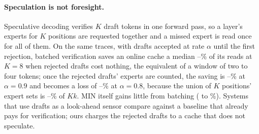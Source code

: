 

\paragraph{Speculation is not foresight.} Speculative decoding verifies $K$ draft tokens in one forward pass, so a
layer's experts for $K$ positions are requested together and a missed expert is read once for all of them. On the same
traces, with drafts accepted at rate $\alpha$ until the first rejection, batched verification saves an online cache a
median \bkFreeMin--\bkFreeMax\% of its reads at $K{=}8$ when rejected drafts cost nothing, the equivalent of a window of
two to four tokens; once the rejected drafts' experts are counted, the saving is \bkSameNineMin--\bkSameNineMax\% at
$\alpha{=}0.9$ and becomes a loss of \bkSameEightLossMin--\bkSameEightLossMax\% at $\alpha{=}0.8$, because the union of
$K$ positions' expert sets is \bkUnionMin--\bkUnionMax\% of $Kk$. MIN itself gains little from batching
(\bkBeladyMin{} to \bkBeladyMax\%). Systems that use drafts as a look-ahead sensor \citep{moespac2026} compare against
a baseline that already pays for verification; ours charges the rejected drafts to a cache that does not speculate.
